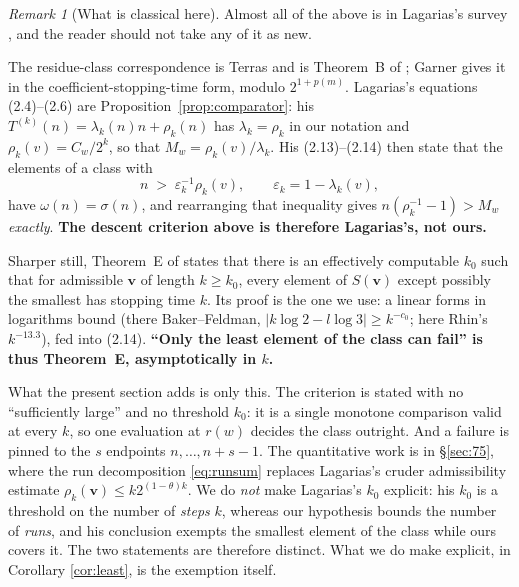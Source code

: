 \documentclass[11pt,a4paper]{article}
\theoremstyle{plain}\newtheorem{theorem}{Theorem}\newtheorem{proposition}[theorem]{Proposition}
\theoremstyle{definition}\newtheorem{example}[theorem]{Example}
\theoremstyle{remark}\newtheorem{remark}[theorem]{Remark}
\begin{document}
\begin{remark}[What is classical here]\label{rem:classical}
Almost all of the above is in Lagarias's survey \cite[\S2.2--\S2.3]{lagarias1985}, and the
reader should not take any of it as new.

The residue-class correspondence is Terras \cite[Thm.~1.2, Cor.~1.3]{terras1976} and is
Theorem~B of \cite{lagarias1985}; Garner \cite[\S4]{garner1981} gives it in the
coefficient-stopping-time form, modulo $2^{1+p(m)}$. Lagarias's equations (2.4)--(2.6) are
Proposition~\ref{prop:comparator}: his $T^{(k)}(n)=\lambda_k(n)n+\rho_k(n)$ has
$\lambda_k=\rho_k$ in our notation and $\rho_k(v)=C_w/2^k$, so that $M_w=\rho_k(v)/\lambda_k$.
His (2.13)--(2.14) then state that the elements of a class with
\[
n\;>\;\varepsilon_k^{-1}\rho_k(v),\qquad \varepsilon_k=1-\lambda_k(v),
\]
have $\omega(n)=\sigma(n)$, and rearranging that inequality gives
$n(\rho_k^{-1}-1)>M_w$ \emph{exactly}. \textbf{The descent criterion above is therefore
Lagarias's, not ours.}

Sharper still, Theorem~E of \cite{lagarias1985} states that there is an effectively computable
$k_0$ such that for admissible $\mathbf v$ of length $k\ge k_0$, every element of $S(\mathbf
v)$ except possibly the smallest has stopping time $k$. Its proof is the one we use: a linear
forms in logarithms bound (there Baker--Feldman, $|k\log2-l\log3|\ge k^{-c_0}$; here Rhin's
$k^{-13.3}$), fed into (2.14). \textbf{``Only the least element of the class can fail'' is thus
Theorem~E, asymptotically in $k$.}

What the present section adds is only this. The criterion is stated with no ``sufficiently
large'' and no threshold $k_0$: it is a single monotone comparison valid at every $k$, so one
evaluation at $r(w)$ decides the class outright. And a failure is pinned to the $s$ endpoints
$n,\dots,n+s-1$. The quantitative work is in \S\ref{sec:75}, where the run decomposition
\eqref{eq:runsum} replaces Lagarias's cruder admissibility estimate
$\rho_k(\mathbf v)\le k2^{(1-\theta)k}$. We do \emph{not} make Lagarias's $k_0$ explicit:
his $k_0$ is a threshold on the number of \emph{steps} $k$, whereas our hypothesis bounds the
number of \emph{runs}, and his conclusion exempts the smallest element of the class while ours
covers it. The two statements are therefore distinct. What we do make explicit, in
Corollary \ref{cor:least}, is the exemption itself.
\end{remark}
\end{document}
